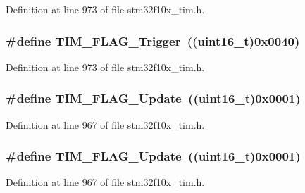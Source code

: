 Definition at line 973 of file stm32f10x\+\_\+tim.\+h.

\subsubsection[{\texorpdfstring{T\+I\+M\+\_\+\+F\+L\+A\+G\+\_\+\+Trigger}{TIM_FLAG_Trigger}}]{\setlength{\rightskip}{0pt plus 5cm}\#define T\+I\+M\+\_\+\+F\+L\+A\+G\+\_\+\+Trigger~(({\bf uint16\+\_\+t})0x0040)}\hypertarget{group___t_i_m___flags_gaeca2f17eea738dbec7eee8ecbe442814}{}\label{group___t_i_m___flags_gaeca2f17eea738dbec7eee8ecbe442814}


Definition at line 973 of file stm32f10x\+\_\+tim.\+h.

\subsubsection[{\texorpdfstring{T\+I\+M\+\_\+\+F\+L\+A\+G\+\_\+\+Update}{TIM_FLAG_Update}}]{\setlength{\rightskip}{0pt plus 5cm}\#define T\+I\+M\+\_\+\+F\+L\+A\+G\+\_\+\+Update~(({\bf uint16\+\_\+t})0x0001)}\hypertarget{group___t_i_m___flags_ga97eba66f792c88e08131bd0d2a0e530d}{}\label{group___t_i_m___flags_ga97eba66f792c88e08131bd0d2a0e530d}


Definition at line 967 of file stm32f10x\+\_\+tim.\+h.

\subsubsection[{\texorpdfstring{T\+I\+M\+\_\+\+F\+L\+A\+G\+\_\+\+Update}{TIM_FLAG_Update}}]{\setlength{\rightskip}{0pt plus 5cm}\#define T\+I\+M\+\_\+\+F\+L\+A\+G\+\_\+\+Update~(({\bf uint16\+\_\+t})0x0001)}\hypertarget{group___t_i_m___flags_ga97eba66f792c88e08131bd0d2a0e530d}{}\label{group___t_i_m___flags_ga97eba66f792c88e08131bd0d2a0e530d}


Definition at line 967 of file stm32f10x\+\_\+tim.\+h.


